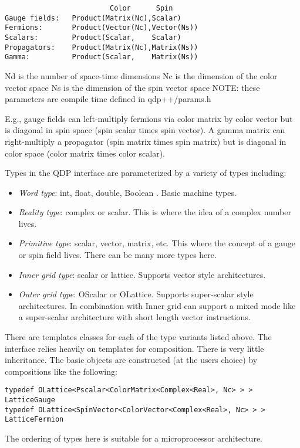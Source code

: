 \documentclass[12pt,letterpaper]{article}
\begin{document}
\begin{verbatim}
                         Color      Spin
Gauge fields:   Product(Matrix(Nc),Scalar)
Fermions:       Product(Vector(Nc),Vector(Ns))
Scalars:        Product(Scalar,    Scalar)
Propagators:    Product(Matrix(Nc),Matrix(Ns))
Gamma:          Product(Scalar,    Matrix(Ns))
\end{verbatim}

\noindent
Nd is the number of space-time dimensions
\noindent
Nc is the dimension of the color vector space
\noindent
Ns is the dimension of the spin vector space
\noindent
NOTE: these parameters are compile time defined in  qdp++/params.h

E.g., gauge fields can left-multiply fermions via color matrix by color
vector but is diagonal in spin space (spin scalar times spin vector).
A gamma matrix can right-multiply a propagator (spin matrix times
spin matrix) but is diagonal in color space (color matrix times color
scalar).

Types in the QDP interface are parameterized by a variety of types including:
\begin{itemize}
\item {\em Word type}: 
  int, float, double, Boolean . Basic machine types.
\item {\em Reality type}: 
  complex or scalar. This is where the idea of a complex number
  lives.
\item {\em Primitive type}: 
  scalar, vector, matrix, etc. This where the concept of a gauge or
  spin field lives. There can be many more types here.
\item {\em Inner grid type}: 
  scalar or lattice. Supports vector style architectures.
\item {\em Outer grid type}:
  OScalar or OLattice. Supports super-scalar style architectures. In
  combination with Inner grid can support a mixed mode like a
  super-scalar architecture with short length vector instructions.
\end{itemize}

There are templates classes for each of the type variants listed
above. The interface relies heavily on templates for
composition. There is very little inheritance. The basic objects are
constructed (at the users choice) by compositions like the following:

\begin{verbatim}
typedef OLattice<Pscalar<ColorMatrix<Complex<Real>, Nc> > > LatticeGauge
typedef OLattice<SpinVector<ColorVector<Complex<Real>, Nc> > > LatticeFermion
\end{verbatim}

The ordering of types here is suitable for a microprocessor architecture.
\end{document}
